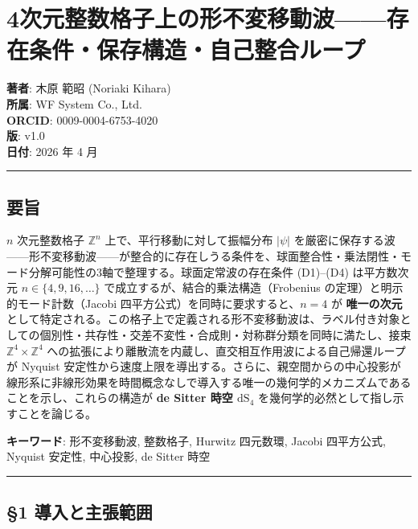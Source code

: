 \documentclass[
  a4paper,11pt]{ltjsarticle}
\theoremstyle{definition}
\theoremstyle{remark}
\begin{document}
\section{4次元整数格子上の形不変移動波------存在条件・保存構造・自己整合ループ}\label{ux6b21ux5143ux6574ux6570ux683cux5b50ux4e0aux306eux5f62ux4e0dux5909ux79fbux52d5ux6ce2ux5b58ux5728ux6761ux4ef6ux4fddux5b58ux69cbux9020ux81eaux5df1ux6574ux5408ux30ebux30fcux30d7}

\textbf{著者}: 木原 範昭 (Noriaki Kihara)\\
\textbf{所属}: WF System Co., Ltd.\\
\textbf{ORCID}: 0009-0004-6753-4020\\
\textbf{版}: v1.0\\
\textbf{日付}: 2026 年 4 月

\begin{center}\rule{0.5\linewidth}{0.5pt}\end{center}

\subsection{要旨}\label{ux8981ux65e8}

\(n\) 次元整数格子 \(\mathbb{Z}^n\) 上で、平行移動に対して振幅分布
\(|\psi|\)
を厳密に保存する波------形不変移動波------が整合的に存在しうる条件を、球面整合性・乗法閉性・モード分解可能性の3軸で整理する。球面定常波の存在条件
(D1)--(D4) は平方数次元 \(n \in \{4, 9, 16, \ldots\}\)
で成立するが、結合的乗法構造（Frobenius
の定理）と明示的モード計数（Jacobi
四平方公式）を同時に要求すると、\(n = 4\) が \textbf{唯一の次元}
として特定される。この格子上で定義される形不変移動波は、ラベル付き対象としての個別性・共存性・交差不変性・合成則・対称群分類を同時に満たし、接束
\(\mathbb{Z}^4 \times \mathbb{Z}^4\)
への拡張により離散流を内蔵し、直交相互作用波による自己帰還ループが
Nyquist
安定性から速度上限を導出する。さらに、親空間からの中心投影が線形系に非線形効果を時間概念なしで導入する唯一の幾何学的メカニズムであることを示し、これらの構造が
\textbf{de Sitter 時空 \(\mathrm{dS}_4\)}
を幾何学的必然として指し示すことを論じる。

\textbf{キーワード}: 形不変移動波, 整数格子, Hurwitz 四元数環, Jacobi
四平方公式, Nyquist 安定性, 中心投影, de Sitter 時空

\begin{center}\rule{0.5\linewidth}{0.5pt}\end{center}

\subsection{§1
導入と主張範囲}\label{ux5c0eux5165ux3068ux4e3bux5f35ux7bc4ux56f2}
\end{document}

